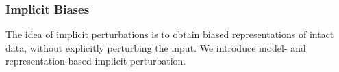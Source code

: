 


\subsubsection{Implicit Biases}
\label{sec:imp_bias}
The idea of implicit perturbations is to obtain biased representations of intact data, without explicitly perturbing the input. We introduce model- and representation-based implicit perturbation.

